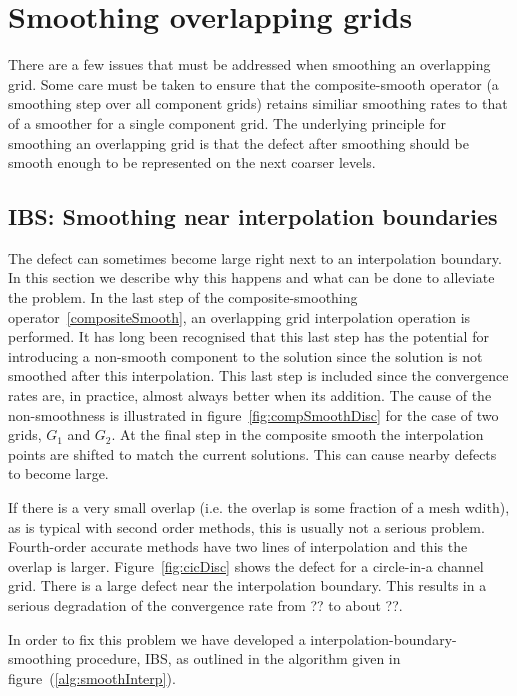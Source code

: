 \documentclass[12pt]{article}
\begin{document}
\clearpage
\section{Smoothing overlapping grids}

There are a few issues that must be addressed when smoothing an overlapping grid.
Some care must be taken to ensure that the composite-smooth operator (a smoothing step
over all component grids) retains similiar smoothing rates to that of a smoother for a 
single component grid. The underlying principle for smoothing an overlapping
grid is that the defect after smoothing should be smooth enough to be represented 
on the next coarser levels.

\subsection{IBS: Smoothing near interpolation boundaries}

  The defect can sometimes become large right next to an interpolation boundary. In this section 
we describe why this happens and what can be done to alleviate the problem.
In the last step of the composite-smoothing operator~\ref{compositeSmooth}, an overlapping grid
interpolation operation is performed. It has long been recognised that this last step has the potential
for introducing a non-smooth component to the solution since the solution is not smoothed after
this interpolation. This last step is included since the convergence rates are, in practice,
almost always better when its addition.
The cause of the non-smoothness is illustrated in figure~\ref{fig:compSmoothDisc} for the case
of two grids, $G_1$ and $G_2$. At the final step in the composite smooth the interpolation points
are shifted to match the current solutions. This can cause nearby defects to become large.

If there is a very small overlap (i.e. the overlap is some fraction of a mesh wdith), 
as is typical with second order methods, this is usually not a serious problem. Fourth-order accurate methods
have two lines of interpolation and this the overlap is larger. Figure~\ref{fig:cicDisc} shows the defect for
a circle-in-a channel grid. There is a large defect near the interpolation boundary. This results in 
a serious degradation of the convergence rate from ?? to about ??.

In order to fix this problem we have developed a interpolation-boundary-smoothing procedure, IBS,  as outlined in the
algorithm given in figure~(\ref{alg:smoothInterp}).
\end{document}

